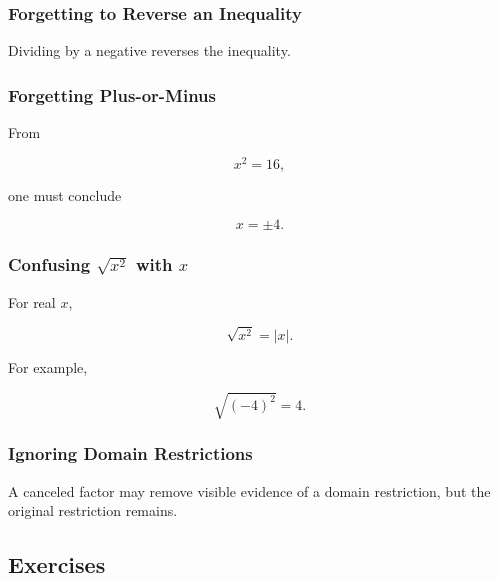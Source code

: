 \subsubsection{Forgetting to Reverse an Inequality}
\label{subsec:error-inequality-reversal}

Dividing by a negative reverses the inequality.

\subsubsection{Forgetting Plus-or-Minus}
\label{subsec:error-plus-minus}

From

\[ x^2=16, \]

one must conclude

\[ x=\pm4. \]

\subsubsection{Confusing \(\sqrt{x^2}\) with \(x\)}
\label{subsec:error-square-root-square}

For real \(x\),

\[ \sqrt{x^2}=|x|. \]

For example,

\[ \sqrt{(-4)^2}=4. \]

\subsubsection{Ignoring Domain Restrictions}
\label{subsec:error-domain-restrictions}

A canceled factor may remove visible evidence of a domain restriction, but the
original restriction remains.

\subsection{Exercises}
\label{subsec:elementary-algebra-exercises}

